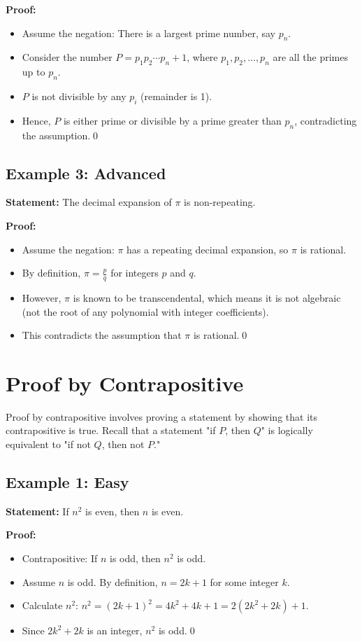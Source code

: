 \documentclass[12pt,a4paper]{article}
\begin{document}
\textbf{Proof:}
\begin{itemize}
    \item Assume the negation: There is a largest prime number, say $p_n$.
    \item Consider the number $P = p_1p_2\cdots p_n + 1$, where $p_1, p_2, \dots, p_n$ are all the primes up to $p_n$.
    \item $P$ is not divisible by any $p_i$ (remainder is 1).
    \item Hence, $P$ is either prime or divisible by a prime greater than $p_n$, contradicting the assumption.\qed
\end{itemize}

\subsection{Example 3: Advanced}
\textbf{Statement:} The decimal expansion of $\pi$ is non-repeating.

\textbf{Proof:}
\begin{itemize}
    \item Assume the negation: $\pi$ has a repeating decimal expansion, so $\pi$ is rational.
    \item By definition, $\pi = \frac{p}{q}$ for integers $p$ and $q$.
    \item However, $\pi$ is known to be transcendental, which means it is not algebraic (not the root of any polynomial with integer coefficients).
    \item This contradicts the assumption that $\pi$ is rational.\qed
\end{itemize}

\newpage

\section{Proof by Contrapositive}
Proof by contrapositive involves proving a statement by showing that its contrapositive is true. Recall that a statement "if $P$, then $Q$" is logically equivalent to "if not $Q$, then not $P$."

\subsection{Example 1: Easy}
\textbf{Statement:} If $n^2$ is even, then $n$ is even.

\textbf{Proof:}
\begin{itemize}
    \item Contrapositive: If $n$ is odd, then $n^2$ is odd.
    \item Assume $n$ is odd. By definition, $n = 2k+1$ for some integer $k$.
    \item Calculate $n^2$: $n^2 = (2k+1)^2 = 4k^2 + 4k + 1 = 2(2k^2 + 2k) + 1$.
    \item Since $2k^2 + 2k$ is an integer, $n^2$ is odd.\qed
\end{itemize}
\end{document}
